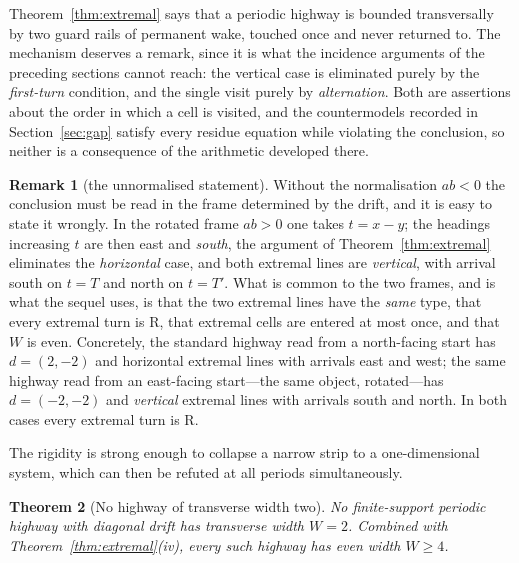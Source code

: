 \documentclass[11pt,reqno]{amsart}
\theoremstyle{plain}
\newtheorem{theorem}{Theorem}[section]
\theoremstyle{definition}
\newtheorem{remark}[theorem]{Remark}
\newcommand{\drift}{d}
\newcommand{\turnR}{\mathrm{R}}
\begin{document}
Theorem~\ref{thm:extremal} says that a periodic highway is bounded transversally by
two guard rails of permanent wake, touched once and never returned to. The mechanism
deserves a remark, since it is what the incidence arguments of the preceding sections
cannot reach: the vertical case is eliminated purely by the \emph{first-turn}
condition, and the single visit purely by \emph{alternation}. Both are assertions
about the order in which a cell is visited, and the countermodels recorded in
Section~\ref{sec:gap} satisfy every residue equation while violating the conclusion,
so neither is a consequence of the arithmetic developed there.

\begin{remark}[the unnormalised statement]\label{rem:frames}
Without the normalisation $ab<0$ the conclusion must be read in the frame determined
by the drift, and it is easy to state it wrongly. In the rotated frame $ab>0$ one
takes $t=x-y$; the headings increasing $t$ are then east and \emph{south}, the
argument of Theorem~\ref{thm:extremal} eliminates the \emph{horizontal} case, and both
extremal lines are \emph{vertical}, with arrival south on $t=T$ and north on $t=T'$.
What is common to the two frames, and is what the sequel uses, is that the two
extremal lines have the \emph{same} type, that every extremal turn is $\turnR$, that
extremal cells are entered at most once, and that $W$ is even. Concretely, the
standard highway read from a north-facing start has $\drift=(2,-2)$ and horizontal
extremal lines with arrivals east and west; the same highway read from an east-facing
start---the same object, rotated---has $\drift=(-2,-2)$ and \emph{vertical} extremal
lines with arrivals south and north. In both cases every extremal turn is $\turnR$.
\end{remark}

The rigidity is strong enough to collapse a narrow strip to a one-dimensional system,
which can then be refuted at all periods simultaneously.

\begin{theorem}[No highway of transverse width two]\label{thm:width2}
No finite-support periodic highway with diagonal drift has transverse width $W=2$.
Combined with Theorem~\ref{thm:extremal}(iv), every such highway has even width
$W\ge4$.
\end{theorem}
\end{document}
